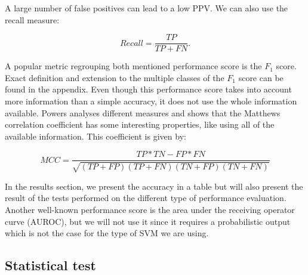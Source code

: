 \documentclass[a4paper,12pt]{article}
\numberwithin{equation}{section}
\begin{document}
A large number of false positives can lead to a low PPV. We can also use the recall measure:

\begin{equation*}
Recall = \frac{TP}{TP + FN}.
\end{equation*} 

A popular metric regrouping both mentioned performance score is the $F_1$ score. Exact definition and extension to the multiple classes of the $F_1$ score can be found in the appendix. Even though this performance score takes into account more information than a simple accuracy, it does not use the whole information available. Powers analyses different measures and shows that the Matthews correlation coefficient has some interesting properties, like using all of the available information. This coefficient is given by:

\begin{equation*}
MCC = \frac{TP*TN-FP*FN}{\sqrt{(TP + FP)(TP + FN)(TN + FP)(TN+FN)}}
\end{equation*}

In the results section, we present the accuracy in a table but will also present the result of the tests performed on the different type of performance evaluation. Another well-known performance score is the area under the receiving operator curve (AUROC), but we will not use it since it requires a probabilistic output which is not the case for the type of SVM we are using.

\newpage
\subsection{Statistical test}
\end{document}
